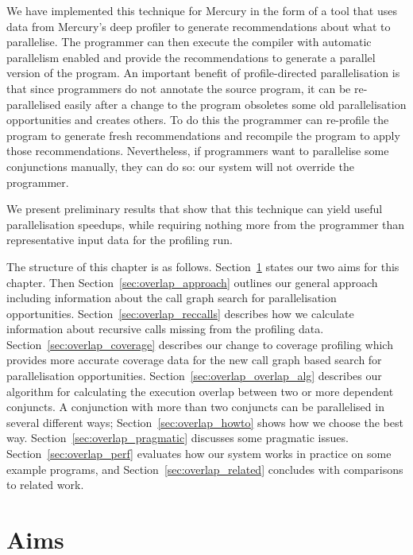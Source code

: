 We have implemented this technique for Mercury
in the form of a tool
that uses data from Mercury's deep profiler
to generate recommendations about what to parallelise.
The programmer can then execute the compiler with automatic parallelism
enabled and provide the recommendations to generate a parallel version of
the program.
An important benefit of profile-directed parallelisation is that
since programmers do not annotate the source program,
it can be re-parallelised easily after a change to the program
obsoletes some old parallelisation opportunities and creates others.
To do this the programmer can re-profile the program to generate fresh
recommendations and recompile the program to apply those recommendations.
Nevertheless, if programmers want to parallelise some conjunctions manually,
they can do so: our system will not override the programmer.

We present preliminary results that show that
this technique can yield useful parallelisation speedups,
while requiring nothing more from the programmer
than representative input data for the profiling run.

The structure of this chapter is as follows.
Section~\ref{sec:overlap_aims} states our two aims for this chapter.
Then Section~\ref{sec:overlap_approach} outlines our general approach
including information about the call graph search for parallelisation
opportunities.
Section~\ref{sec:overlap_reccalls}
describes how we calculate information about recursive calls missing from
the profiling data.
Section~\ref{sec:overlap_coverage}
describes our change to coverage profiling which provides more accurate
coverage data for the new call graph based search for parallelisation
opportunities.
Section~\ref{sec:overlap_overlap_alg} describes our algorithm for
calculating the execution overlap between two or more dependent conjuncts.
A conjunction with more than two conjuncts can be parallelised
in several different ways;
Section~\ref{sec:overlap_howto} shows how we choose the best way.
Section~\ref{sec:overlap_pragmatic} discusses some pragmatic issues.
Section~\ref{sec:overlap_perf} evaluates
how our system works in practice on some example programs, and
Section~\ref{sec:overlap_related} concludes
with comparisons to related work.

\section{Aims}
\label{sec:overlap_aims}



